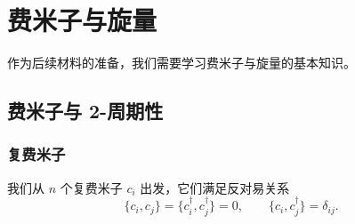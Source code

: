 \providecommand{\Rep}{\operatorname{Rep}}
\chapter{费米子与旋量}

作为后续材料的准备，我们需要学习费米子与旋量的基本知识。

\section{费米子与 2-周期性}

\subsection{复费米子}

我们从 $n$ 个复费米子 $c_i$ 出发，它们满足反对易关系
\begin{equation}
  \{c_i,c_j\}=\{c_i^\dagger,c_j^\dagger\}=0,\qquad
  \{c_i,c_j^\dagger\}=\delta_{ij}.
  \tag{10.1}
\end{equation}

